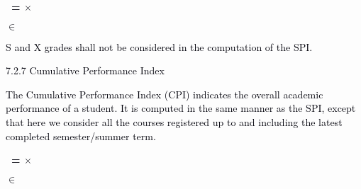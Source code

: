 \documentclass[12pt]{article}
\begin{document}
\vspace{\baselineskip}
\begin{Center}
\textbf{\textcolor[HTML]{00000A}{\ =  \textsubscript{} $ \times $  \textsubscript{}\textsubscript{}}}
\end{Center}\par


\vspace{\baselineskip}
\begin{adjustwidth}{3.0in}{0.0in}
{\fontsize{8pt}{9.6pt}\selectfont \textbf{\textcolor[HTML]{00000A}{$ \in $  \tabto{4.18in} }}\par}\par

\end{adjustwidth}


\vspace{\baselineskip}
{\fontsize{10pt}{12.0pt}\selectfont \textcolor[HTML]{00000A}{S and X grades shall not be considered in the computation of the SPI.}\par}\par


\vspace{\baselineskip}
{\fontsize{10pt}{12.0pt}\selectfont \textcolor[HTML]{00000A}{7.2.7 Cumulative Performance Index}\par}\par


\vspace{\baselineskip}
\begin{adjustwidth}{0.0in}{0.04in}
{\fontsize{10pt}{12.0pt}\selectfont \textcolor[HTML]{00000A}{The Cumulative Performance Index (CPI) indicates the overall academic performance of a student. It is computed in the same manner as the SPI, except that here we consider all the courses registered up to and including the latest completed semester/summer term.}\par}\par

\end{adjustwidth}


\vspace{\baselineskip}
\begin{Center}
\textbf{\textcolor[HTML]{00000A}{\ =  \textsubscript{} $ \times $  \textsubscript{}\textsubscript{}}}
\end{Center}\par


\vspace{\baselineskip}
\begin{adjustwidth}{3.03in}{0.0in}
{\fontsize{8pt}{9.6pt}\selectfont \textbf{\textcolor[HTML]{00000A}{$ \in $  \tabto{4.17in} }}\par}\par

\end{adjustwidth}
\end{document}

